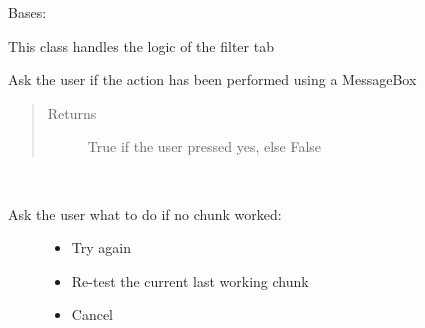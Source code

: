 \documentclass[letterpaper,10pt,english]{sphinxmanual}
\begin{document}
\begin{fulllineitems}
\label{\detokenize{src:src.SearcherTab.SearcherTab}}
Bases: {\hyperref[\detokenize{src:src.AbstractTab.AbstractTab}]{}}

This class handles the logic of the filter tab

\begin{fulllineitems}
\label{\detokenize{src:src.SearcherTab.SearcherTab.__init__}}
\end{fulllineitems}


\begin{fulllineitems}
\label{\detokenize{src:src.SearcherTab.SearcherTab.askActionPerformed}}
Ask the user if the action has been performed using a MessageBox
\begin{quote}\begin{description}
\item[{Returns}] \leavevmode
True if the user pressed yes, else False

\end{description}\end{quote}

\end{fulllineitems}


\begin{fulllineitems}
\label{\detokenize{src:src.SearcherTab.SearcherTab.askWhichAction}}~\begin{description}
\item[{Ask the user what to do if no chunk worked:}] \leavevmode\begin{itemize}
\item {} 
Try again

\item {} 
Re-test the current last working chunk

\item {} 
Cancel


\end{itemize}
\end{description}
\end{fulllineitems}
\end{fulllineitems}
\end{document}
